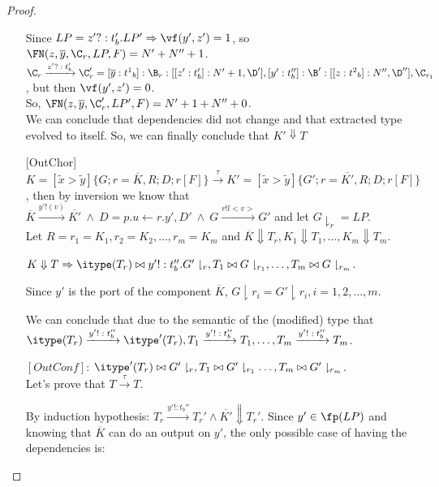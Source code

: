 \begin{proof}
\begin{itemize}
Since $LP=z'?:t_b'.LP'\Rightarrow \vf(y',z')=1$, so $\FN(z,\overline{y},\C_r,LP,F)=N'+N''+1$.\\

$\C_r\xrightarrow{\text{$z'?:t_b'$}}\C_r'=[\overline{y}:{t^1}_b]:\B_r:[[z':t_b']:N'+1,\D'],[y':t_b'']:\B':[[z:{t^2}_b]:N'',\D''],\C_{r_1 }$, but then $\vf(y',z')=0$.\\

So, $\FN(z,\overline{y},\C_r',LP',F)=N'+1+N''+0$.\\

We can conclude that dependencies did not change and that extracted type evolved to itself. So, we can finally conclude that $K'\Downarrow T$


\item [{[OutChor]}]
$K=[\tilde{x}>\tilde{y}]\{G;r=\overline{K},R;D;r[F]\}\xrightarrow{\text{$\tau$}} K'=[\tilde{x}>\tilde{y}]\{G';r=\overline{K'},R;D;r[F]\}$, then by inversion we know that $ \overline{K}\xrightarrow{\text{$y'!(v)$}}\overline{K'}\  \wedge \  D=p.u\leftarrow r.y',D' \ \wedge \ G\xrightarrow{\text{$r!l<v>$}}G'$ and let $G\downharpoonright_r=LP$.\\

Let $R=r_1=K_1,r_2=K_2,\dots, r_m=K_m$ and
$\overline{K}\Downarrow T_r, K_1\Downarrow T_1,\dots, K_m\Downarrow T_m$.

$K\Downarrow T\Rightarrow\itype(T_r)\bowtie y'!:t_b''.G'\downharpoonright_{r}, T_1\bowtie G\downharpoonright_{r_1},\dots, T_m \bowtie G\downharpoonright_{r_m}$.

Since $y'$ is the port of the component $\overline{K}$, $G\downharpoonright{r_i}=G'\downharpoonright{r_i}, i=1,2,\dots, m.$

We can conclude that due to the semantic of the (modified) type that   $\itype(T_r)\xrightarrow{\text{$y'!:t_b''$}}\itype'(T_r), T_1\xrightarrow{\text{$y'!:t_b''$}}T_1,\dots, T_m\xrightarrow{\text{$y'!:t_b''$}}T_m$.

$[OutConf]$: $\itype'(T_r)\bowtie G'\downharpoonright_{r}, T_1\bowtie G'\downharpoonright_{r_1}\dots, T_m\bowtie G'\downharpoonright_{r_m}$. \\

Let's prove that $T\xrightarrow{\text{$\tau$}}T$. 









By induction hypothesis: $T_r\xrightarrow{\text{$y'!:t_b''$}} T_r' \wedge \overline{K'}\Downarrow T_r'$. Since $y'\in \fp(LP)$ and knowing that $\overline{K}$ can do an output on $y'$, the only possible case of having the dependencies is: \\


\end{itemize}
\end{proof}
